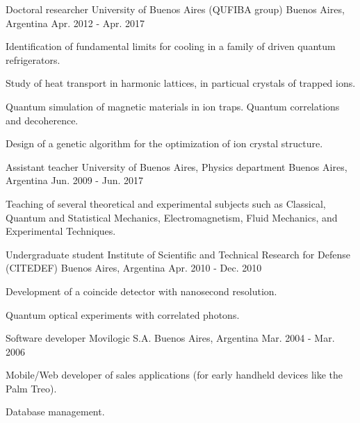 \begin{cventries}
  \cventry
    {Doctoral researcher} %
    {University of Buenos Aires (QUFIBA group) } %
    {Buenos Aires, Argentina} %
    {Apr. 2012 - Apr. 2017} %
    {
      \begin{cvitems} %
        \item Identification of fundamental limits for cooling in a family of driven quantum refrigerators.
        \item Study of heat transport in harmonic lattices, in particual crystals of trapped ions.
        \item Quantum simulation of magnetic materials in ion traps. Quantum correlations and decoherence.
        \item Design of a genetic algorithm for the optimization of ion crystal structure.
      \end{cvitems}
    }

  \cventry
    {Assistant teacher} %
    {University of Buenos Aires, Physics department} %
    {Buenos Aires, Argentina} %
    {Jun. 2009 - Jun. 2017} %
    {
      \begin{cvitems} %
        \item Teaching of several theoretical and experimental subjects such as Classical, Quantum and Statistical Mechanics,
        Electromagnetism, Fluid Mechanics, and Experimental Techniques.
      \end{cvitems}
    }

  \cventry
    {Undergraduate student} %
    {Institute of Scientific and Technical Research for Defense (CITEDEF)} %
    {Buenos Aires, Argentina} %
    {Apr. 2010 - Dec. 2010} %
    {
      \begin{cvitems} %
        \item Development of a coincide detector with nanosecond resolution.
        \item Quantum optical experiments with correlated photons.
      \end{cvitems}
    }

  \cventry
    {Software developer} %
    {Movilogic S.A.} %
    {Buenos Aires, Argentina} %
    {Mar. 2004 - Mar. 2006} %
    {
      \begin{cvitems}
        \item Mobile/Web developer of sales applications (for early handheld devices like the Palm Treo).
        \item Database management.
      \end{cvitems}
    }



\end{cventries}
